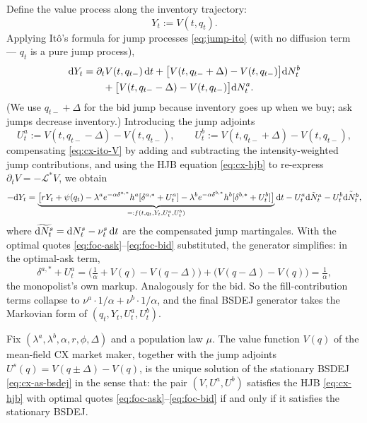 Define the value process along the inventory trajectory:
\begin{equation}
  Y_t := V(t, q_t).
\end{equation}
Applying It\^o's formula for jump processes \eqref{eq:jump-ito} (with no diffusion term --- $q_t$ is a pure jump process),
\begin{align}
  \mathrm{d} Y_t &= \partial_t V(t, q_{t-}) \, \mathrm{d} t + \bigl[V(t, q_{t-} + \Delta) - V(t, q_{t-})\bigr] \mathrm{d} N^b_t \nonumber \\
  &\qquad + \bigl[V(t, q_{t-} - \Delta) - V(t, q_{t-})\bigr] \mathrm{d} N^a_t. \label{eq:cx-ito-V}
\end{align}
(We use $q_{t-} + \Delta$ for the bid jump because inventory goes up when we buy; ask jumps decrease inventory.) Introducing the jump adjoints
\begin{equation}
  U^a_t := V(t, q_{t-} - \Delta) - V(t, q_{t-}), \qquad U^b_t := V(t, q_{t-} + \Delta) - V(t, q_{t-}),
  \label{eq:cx-jump-adjoints}
\end{equation}
compensating \eqref{eq:cx-ito-V} by adding and subtracting the intensity-weighted jump contributions, and using the HJB equation \eqref{eq:cx-hjb} to re-express $\partial_t V = -\mathcal{L}^* V$, we obtain
\begin{equation}
  -\mathrm{d} Y_t = \underbrace{\bigl[r Y_t + \psi(q_t) - \lambda^a e^{-\alpha \delta^{a,*}} h^a [\delta^{a,*} + U^a_t] - \lambda^b e^{-\alpha \delta^{b,*}} h^b [\delta^{b,*} + U^b_t]\bigr]}_{=: f(t, q_t, Y_t, U^a_t, U^b_t)} \mathrm{d} t - U^a_t \tilde{\mathrm{d} N^a_t} - U^b_t \tilde{\mathrm{d} N^b_t},
  \label{eq:cx-as-bsdej}
\end{equation}
where $\widetilde{\mathrm{d} N^s_t} = \mathrm{d} N^s_t - \nu^s_t \, \mathrm{d} t$ are the compensated jump martingales. With the optimal quotes \eqref{eq:foc-ask}--\eqref{eq:foc-bid} substituted, the generator simplifies: in the optimal-ask term,
\[
  \delta^{a,*} + U^a_t = \bigl(\tfrac{1}{\alpha} + V(q) - V(q - \Delta)\bigr) + \bigl(V(q - \Delta) - V(q)\bigr) = \tfrac{1}{\alpha},
\]
the monopolist's own markup. Analogously for the bid. So the fill-contribution terms collapse to $\nu^a \cdot 1/\alpha + \nu^b \cdot 1/\alpha$, and the final BSDEJ generator takes the Markovian form of $(q_t, Y_t, U^a_t, U^b_t)$.

\begin{proposition}
\label{prop:cx-bsdej}
Fix $(\lambda^a, \lambda^b, \alpha, r, \phi, \Delta)$ and a population law $\mu$. The value function $V(q)$ of the mean-field CX market maker, together with the jump adjoints $U^s(q) = V(q \pm \Delta) - V(q)$, is the unique solution of the stationary BSDEJ \eqref{eq:cx-as-bsdej} in the sense that: the pair $(V, U^a, U^b)$ satisfies the HJB \eqref{eq:cx-hjb} with optimal quotes \eqref{eq:foc-ask}--\eqref{eq:foc-bid} if and only if it satisfies the stationary BSDEJ.
\end{proposition}

